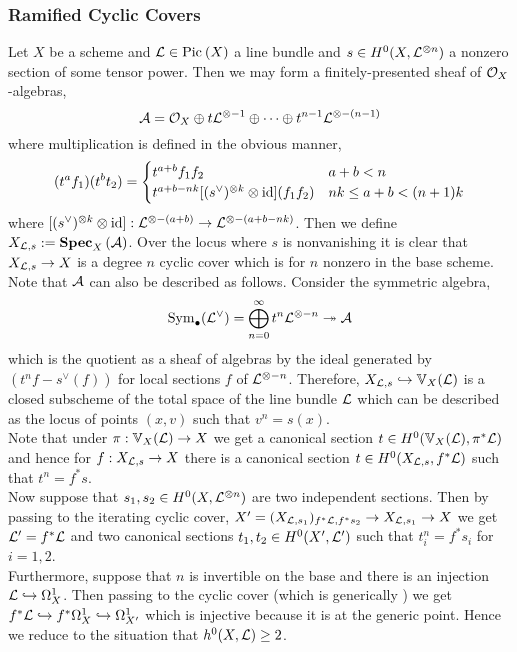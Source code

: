 \documentclass[12pt]{article}
\newcommand{\V}{\mathbb{V}}
\begin{document}
\subsubsection{Ramified Cyclic Covers}

Let $X$ be a scheme and $\mathcal{L} \in \mathrm{Pic}^{} \left( X \right)$ a line bundle and $s \in H^0(X, \mathcal{L}^{\otimes n})$ a nonzero section of some tensor power. Then we may form a finitely-presented sheaf of $\mathcal{O}_{X}$-algebras,
\[ \mathcal{A} = \mathcal{O}_{X} \oplus t \mathcal{L}^{\otimes -1} \oplus \cdots \oplus t^{n-1} \mathcal{L}^{\otimes -(n-1)} \]
where multiplication is defined in the obvious manner,
\[ (t^a f_1) (t^b t_2)  = 
\begin{cases}
t^{a+b} f_1 f_2 & a + b < n
\\
t^{a + b - nk} [(s^\vee)^{\otimes k} \otimes \mathrm{id}](f_1 f_2) & nk \le a + b < (n+1)k
\end{cases}  \]
where $[(s^\vee)^{\otimes k} \otimes \mathrm{id}] : \mathcal{L}^{\otimes -(a+b)} \to \mathcal{L}^{\otimes -(a + b - nk)}$. Then we define $X_{\mathcal{L}, s} := \mathbf{Spec}_{X}\left( \mathcal{A} \right)$. Over the locus where $s$ is nonvanishing it is clear that $X_{\mathcal{L}, s} \to X$ is a degree $n$ cyclic cover which is \etale for $n$ nonzero in the base scheme. 
\bigskip\\
Note that $\mathcal{A}$ can also be described as follows. Consider the symmetric algebra,
\[ \mathrm{Sym}_{\bullet}\! \left( \mathcal{L}^\vee \right) = \bigoplus_{n = 0}^\infty t^n \mathcal{L}^{\otimes -n} \twoheadrightarrow \mathcal{A} \]
which is the quotient as a sheaf of algebras by the ideal generated by $(t^n f - s^\vee(f))$ for local sections $f$ of $\mathcal{L}^{\otimes -n}$. Therefore, $X_{\L, s} \embed \V_X(\L)$ is a closed subscheme of the total space of the line bundle $\mathcal{L}$ which can be described as the locus of points $(x, v)$ such that $v^n = s(x)$.
\bigskip\\
Note that under $\pi : \V_X(\L) \to X$ we get a canonical section $t \in H^0(\V_X(\L), \pi^* \L)$ and hence for $f : X_{\mathcal{L}, s} \to X$ there is a canonical section $t \in H^0(X_{\mathcal{L}, s}, f^* \mathcal{L})$ such that $t^n = f^* s$. 
\bigskip\\
Now suppose that $s_1, s_2 \in H^0(X, \mathcal{L}^{\otimes n})$ are two independent sections. Then by passing to the iterating cyclic cover, $X' = (X_{\mathcal{L}, s_1})_{f^* \mathcal{L}, f^* s_2} \to X_{\mathcal{L}, s_1} \to X$ we get $\mathcal{L}' = f^* \mathcal{L}$ and two canonical sections $t_1, t_2 \in H^0(X', \mathcal{L}')$ such that $t_i^n = f^* s_i$ for $i = 1,2$. 
\bigskip\\
Furthermore, suppose that $n$ is invertible on the base and there is an injection $\mathcal{L} \hookrightarrow \Omega_X^1$. Then passing to the cyclic cover (which is generically \etale) we get $f^* \mathcal{L} \hookrightarrow f^* \Omega_X^1 \hookrightarrow \Omega_{X'}^1$ which is injective because it is at the generic point. Hence we reduce to the situation that $h^0(X, \mathcal{L}) \ge 2$.
\end{document}
